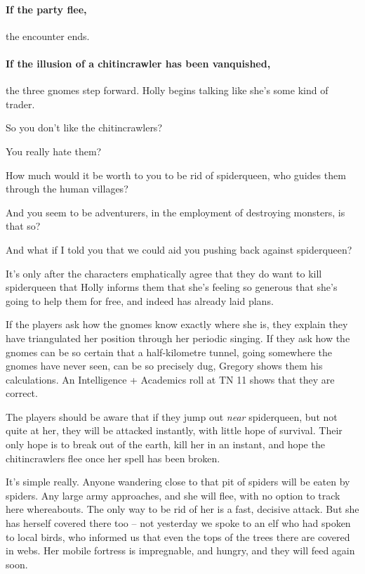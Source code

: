 \begin{multicols}{2}
\begin{boxtext}
\end{boxtext}

\paragraph{If the party flee,}
the encounter ends.

\paragraph{If the illusion of a chitincrawler has been vanquished,}
the three gnomes step forward.
Holly begins talking like she's some kind of trader.

\begin{speechtext}

  So you don't like the chitincrawlers?

  You really hate them?

  How much would it be worth to you to be rid of \gls{spiderqueen}, who guides them through the human villages?

  And you seem to be adventurers, in the employment of destroying monsters, is that so?

  And what if I told you that we could aid you pushing back against \gls{spiderqueen}?

\end{speechtext}

It's only after the characters emphatically agree that they do want to kill \gls{spiderqueen} that Holly informs them that she's feeling so generous that she's going to help them for free, and indeed has already laid plans.

If the players ask how the gnomes know exactly where she is, they explain they have triangulated her position through her periodic singing.
If they ask how the gnomes can be so certain that a half-kilometre tunnel, going somewhere the gnomes have never seen, can be so precisely dug, Gregory shows them his calculations.
An Intelligence + Academics roll at TN 11 shows that they are correct.

The players should be aware that if they jump out \emph{near} \gls{spiderqueen}, but not quite at her, they will be attacked instantly, with little hope of survival.
Their only hope is to break out of the earth, kill her in an instant, and hope the chitincrawlers flee once her spell has been broken.

\begin{speechtext}

  It's simple really.
  Anyone wandering close to that pit of spiders will be eaten by spiders.
  Any large army approaches, and she will flee, with no option to track here whereabouts.
  The only way to be rid of her is a fast, decisive attack.
  But she has herself covered there too -- not yesterday we spoke to an elf who had spoken to local birds, who informed us that even the tops of the trees there are covered in webs.
  Her mobile fortress is impregnable, and hungry, and they will feed again soon.


\end{speechtext}
\end{multicols}
